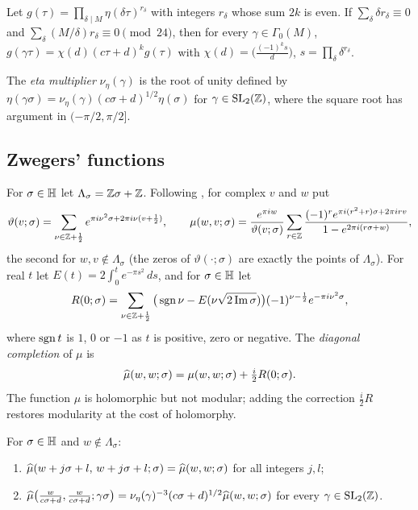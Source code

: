 \begin{fact}\label{fact:etaquot}
Let $g(\tau)=\prod_{\delta\mid M}\eta(\delta\tau)^{r_\delta}$ with integers
$r_\delta$ whose sum $2k$ is even. If $\sum_\delta\delta r_\delta\equiv0$ and
$\sum_\delta(M/\delta)r_\delta\equiv0\pmod{24}$, then for every
$\gamma\in\Gamma_0(M)$,
$g(\gamma\tau)=\chi(d)(c\tau+d)^kg(\tau)$ with
$\chi(d)=\big(\frac{(-1)^ks}{d}\big)$, $s=\prod_\delta\delta^{r_\delta}$.
\end{fact}

The \emph{eta multiplier} $\nu_\eta(\gamma)$ is the root of unity defined by
$\eta(\gamma\sigma)=\nu_\eta(\gamma)(c\sigma+d)^{1/2}\eta(\sigma)$ for
$\gamma\in\mathrm{SL}_2(\mathbb{Z})$, where the square root has argument in
$(-\pi/2,\pi/2]$.

\subsection{Zwegers' functions}\label{sec:zwegers}
For $\sigma\in\mathbb{H}$ let $\Lambda_\sigma=\mathbb{Z}\sigma+\mathbb{Z}$. Following
\cite[\S1.3]{Zwegers}, for complex $v$ and $w$ put
\[
\vartheta(v;\sigma)=\sum_{\nu\in\mathbb{Z}+\frac12}e^{\pi i\nu^2\sigma+2\pi i\nu(v+\frac12)},
\qquad
\mu(w,v;\sigma)=\frac{e^{\pi iw}}{\vartheta(v;\sigma)}
\sum_{r\in\mathbb{Z}}\frac{(-1)^re^{\pi i(r^2+r)\sigma+2\pi irv}}{1-e^{2\pi i(r\sigma+w)}},
\]
the second for $w,v\notin\Lambda_\sigma$ (the zeros of $\vartheta(\cdot;\sigma)$
are exactly the points of $\Lambda_\sigma$). For real $t$ let
$E(t)=2\int_0^te^{-\pi s^2}\,ds$, and for $\sigma\in\mathbb{H}$ let
\[
R(0;\sigma)=\sum_{\nu\in\mathbb{Z}+\frac12}\big(\operatorname{sgn}\nu-E(\nu\sqrt{2\operatorname{Im}\sigma})\big)
(-1)^{\nu-\frac12}e^{-\pi i\nu^2\sigma},
\]
where $\operatorname{sgn} t$ is $1$, $0$ or $-1$ as $t$ is positive, zero or negative. The
\emph{diagonal completion} of $\mu$ is
\[
\widehat{\mu}(w,w;\sigma)=\mu(w,w;\sigma)+\tfrac{i}{2}R(0;\sigma).
\]
The function $\mu$ is holomorphic but not modular; adding the correction
$\frac i2R$ restores modularity at the cost of holomorphy.

\begin{fact}\label{fact:zwegers}
For $\sigma\in\mathbb{H}$ and $w\notin\Lambda_\sigma$:
\begin{enumerate}[label=(\alph*)]
\item $\widehat{\mu}(w+j\sigma+l,\,w+j\sigma+l;\sigma)=\widehat{\mu}(w,w;\sigma)$ for all integers
$j,l$;
\item $\widehat{\mu}\big(\tfrac{w}{c\sigma+d},\tfrac{w}{c\sigma+d};\gamma\sigma\big)
=\nu_\eta(\gamma)^{-3}(c\sigma+d)^{1/2}\widehat{\mu}(w,w;\sigma)$ for every
$\gamma\in\mathrm{SL}_2(\mathbb{Z})$.
\end{enumerate}
\end{fact}
